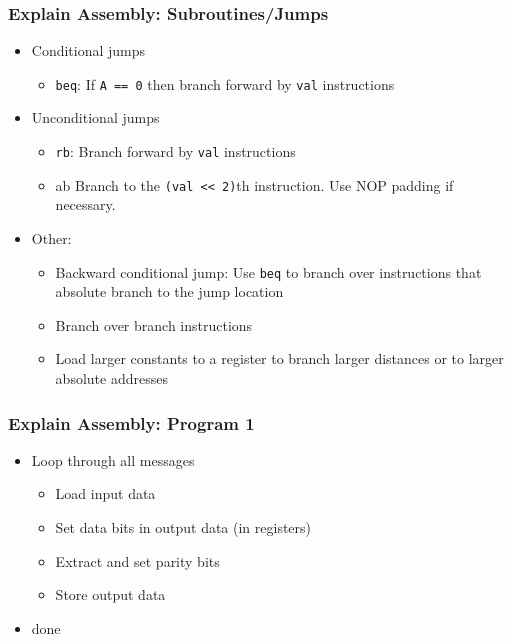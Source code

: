 	\begin{frame}
		\frametitle{Explain Assembly: Subroutines/Jumps}

		\begin{itemize}
			\item Conditional jumps
				\begin{itemize}
					\item \texttt{beq}: If \texttt{A == 0} then branch forward by \texttt{val} instructions
				\end{itemize}
			\item Unconditional jumps
				\begin{itemize}
					\item \texttt{rb}: Branch forward by \texttt{val} instructions
					\item {ab} Branch to the \texttt{(val << 2)}th instruction. Use NOP padding if necessary.
				\end{itemize}
			\item Other:
				\begin{itemize}
					\item Backward conditional jump: Use \texttt{beq} to branch over instructions that absolute branch to the jump location
					\item Branch over branch instructions
					\item Load larger constants to a register to branch larger distances or to larger absolute addresses
				\end{itemize}
		\end{itemize}
	\end{frame}

	\begin{frame}
		\frametitle{Explain Assembly: Program 1}
		\begin{itemize}
			\item Loop through all messages
				\begin{itemize}
					\item Load input data
					\item Set data bits in output data (in registers)
					\item Extract and set parity bits
					\item Store output data
				\end{itemize}
			\item done
		\end{itemize}
	\end{frame}

